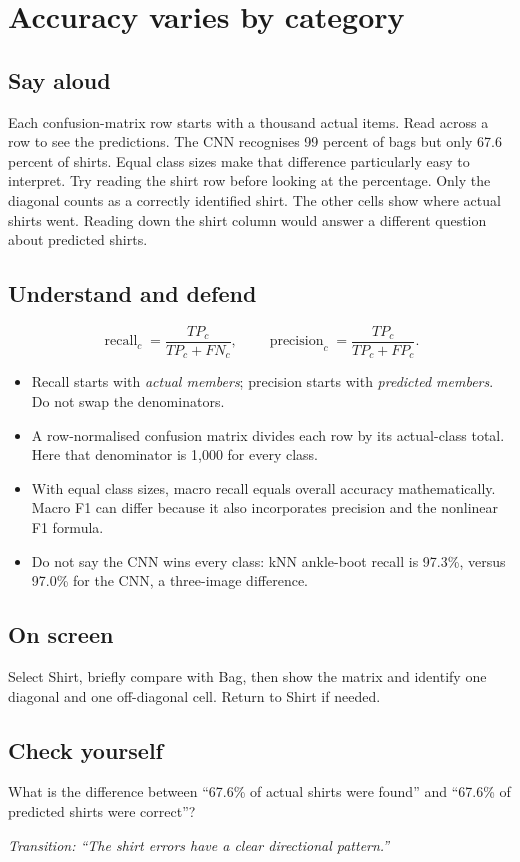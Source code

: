 \documentclass[11pt,a4paper]{article}
\newcommand{\slide}[3]{\clearpage{\small\color{olive}SLIDE #1\hfill Target: #3}\par\section{#2}}
\newcommand{\say}{\subsection{Say aloud}}
\newcommand{\understand}{\subsection{Understand and defend}}
\newcommand{\screen}{\subsection{On screen}}
\newcommand{\selfcheck}[1]{\subsection{Check yourself}#1}
\newcommand{\transition}[1]{\par\smallskip\textit{Transition: #1}}
\newcounter{question}
\begin{document}
\slide{12}{Accuracy varies by category}{35 seconds}
\say
Each confusion-matrix row starts with a thousand actual items. Read across a row to see the predictions. The CNN recognises 99 percent of bags but only 67.6 percent of shirts. Equal class sizes make that difference particularly easy to interpret. Try reading the shirt row before looking at the percentage. Only the diagonal counts as a correctly identified shirt. The other cells show where actual shirts went. Reading down the shirt column would answer a different question about predicted shirts.
\understand
\[
\operatorname{recall}_c=\frac{TP_c}{TP_c+FN_c},\qquad
\operatorname{precision}_c=\frac{TP_c}{TP_c+FP_c}.
\]
\begin{itemize}
\item Recall starts with \emph{actual members}; precision starts with \emph{predicted members}. Do not swap the denominators.
\item A row-normalised confusion matrix divides each row by its actual-class total. Here that denominator is 1,000 for every class.
\item With equal class sizes, macro recall equals overall accuracy mathematically. Macro F1 can differ because it also incorporates precision and the nonlinear F1 formula.
\item Do not say the CNN wins every class: kNN ankle-boot recall is 97.3\%, versus 97.0\% for the CNN, a three-image difference.
\end{itemize}
\screen
Select Shirt, briefly compare with Bag, then show the matrix and identify one diagonal and one off-diagonal cell. Return to Shirt if needed.
\selfcheck{What is the difference between ``67.6\% of actual shirts were found'' and ``67.6\% of predicted shirts were correct''?}
\transition{``The shirt errors have a clear directional pattern.''}
\end{document}
